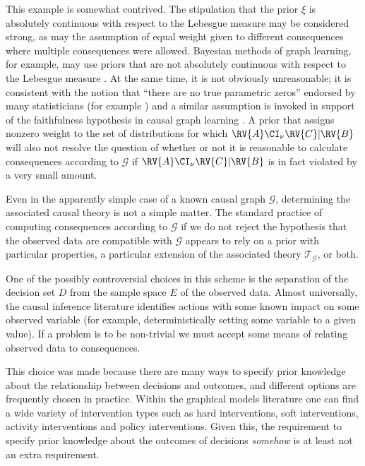 This example is somewhat contrived. The stipulation that the prior $\xi$ is absolutely continuous with respect to the Lebesgue measure may be considered strong, as may the assumption of equal weight given to different consequences where multiple consequences were allowed. Bayesian methods of graph learning, for example, may use priors that are not absolutely continuous with respect to the Lebesgue measure \cite{chickering_optimal_2003}. At the same time, it is not obviously unreasonable; it is consistent with the notion that ``there are no true parametric zeros'' endorsed by many statisticians (for example  \cite{gelman_bayesian_2010,meehl_theory-testing_1967,berkson_difficulties_1938}) and a similar assumption is invoked in support of the faithfulness hypothesis in causal graph learning \cite{meek_strong_1995}. A prior that assigns nonzero weight to the set of distributions for which $\RV{A} \CI_\nu \RV{C} | \RV{B}$ will also not resolve the question of whether or not it is reasonable to calculate consequences according to $\mathcal{G}$ if $\RV{A} \CI_\nu \RV{C} | \RV{B}$ is in fact violated by a very small amount.

Even in the apparently simple case of a known causal graph $\mathcal{G}$, determining the associated causal theory is not a simple matter. The standard practice of computing consequences according to $\mathcal{G}$ if we do not reject the hypothesis that the observed data are compatible with $\mathcal{G}$ appears to rely on a prior with particular properties, a particular extension of the associated theory $\mathscr{T}_{\mathcal{G}}$, or both.


One of the possibly controversial choices in this scheme is the separation of the decision set $D$ from the sample space $E$ of the observed data. Almost universally, the causal inference literature identifies actions with some known impact on some observed variable (for example, deterministically setting some variable to a given value). If a problem is to be non-trivial we must accept some means of relating observed data to consequences.

This choice was made because there are many ways to specify prior knowledge about the relationship between decisions and outcomes, and different options are frequently chosen in practice. Within the graphical models literature one can find a wide variety of intervention types such as hard interventions, soft interventions, activity interventions and policy interventions. Given this, the requirement to specify prior knowledge about the outcomes of decisions \emph{somehow} is at least not an extra requirement.

